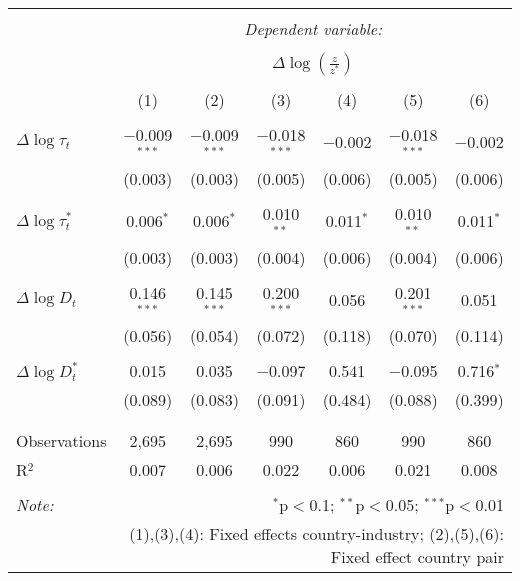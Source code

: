 
\begin{tabular}{@{\extracolsep{5pt}}lcccccc} 
\\[-1.8ex]\hline 
\hline \\[-1.8ex] 
 & \multicolumn{6}{c}{\textit{Dependent variable:}} \\ 
\cline{2-7} 
\\[-1.8ex] & \multicolumn{6}{c}{$\Delta \log \left(\frac{z}{z^*} \right)$} \\ 
\\[-1.8ex] & (1) & (2) & (3) & (4) & (5) & (6)\\ 
\hline \\[-1.8ex] 
 $\Delta \log \tau_t$ & $-$0.009$^{***}$ & $-$0.009$^{***}$ & $-$0.018$^{***}$ & $-$0.002 & $-$0.018$^{***}$ & $-$0.002 \\ 
  & (0.003) & (0.003) & (0.005) & (0.006) & (0.005) & (0.006) \\ 
  & & & & & & \\ 
 $\Delta \log \tau_t^*$ & 0.006$^{*}$ & 0.006$^{*}$ & 0.010$^{**}$ & 0.011$^{*}$ & 0.010$^{**}$ & 0.011$^{*}$ \\ 
  & (0.003) & (0.003) & (0.004) & (0.006) & (0.004) & (0.006) \\ 
  & & & & & & \\ 
 $\Delta \log D_t$ & 0.146$^{***}$ & 0.145$^{***}$ & 0.200$^{***}$ & 0.056 & 0.201$^{***}$ & 0.051 \\ 
  & (0.056) & (0.054) & (0.072) & (0.118) & (0.070) & (0.114) \\ 
  & & & & & & \\ 
 $\Delta \log D_t^*$ & 0.015 & 0.035 & $-$0.097 & 0.541 & $-$0.095 & 0.716$^{*}$ \\ 
  & (0.089) & (0.083) & (0.091) & (0.484) & (0.088) & (0.399) \\ 
  & & & & & & \\ 
\hline \\[-1.8ex] 
Observations & 2,695 & 2,695 & 990 & 860 & 990 & 860 \\ 
R$^{2}$ & 0.007 & 0.006 & 0.022 & 0.006 & 0.021 & 0.008 \\ 
\hline 
\hline \\[-1.8ex] 
\textit{Note:}  & \multicolumn{6}{r}{$^{*}$p$<$0.1; $^{**}$p$<$0.05; $^{***}$p$<$0.01} \\ 
 & \multicolumn{6}{r}{(1),(3),(4): Fixed effects country-industry; (2),(5),(6): Fixed effect country pair} \\ 
\end{tabular} 
